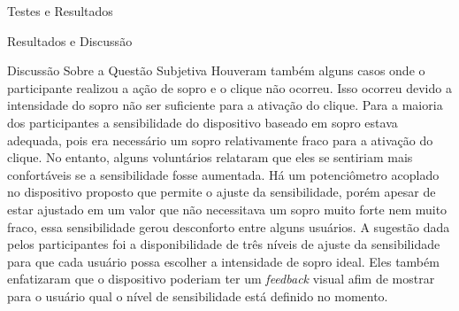 \begin{chapter}{Testes e Resultados}
\begin{section}{Resultados e Discussão}
\begin{subsection}{Discussão Sobre a Questão Subjetiva}
Houveram também alguns casos onde o participante realizou a ação de sopro e o
clique não ocorreu. Isso ocorreu devido a intensidade do sopro não ser
suficiente para a ativação do clique. Para a maioria dos participantes a
sensibilidade do dispositivo baseado em sopro estava adequada, pois era
necessário um sopro relativamente fraco para a ativação do clique. No entanto,
alguns voluntários relataram que eles se sentiriam mais confortáveis se a
sensibilidade fosse aumentada. Há um potenciômetro acoplado no dispositivo
proposto que permite o ajuste da sensibilidade, porém apesar de estar ajustado
em um valor que não necessitava um sopro muito forte nem muito fraco, essa
sensibilidade gerou desconforto entre alguns usuários. A sugestão dada pelos
participantes foi a disponibilidade de três níveis de ajuste da sensibilidade
para que cada usuário possa escolher a intensidade de sopro ideal. Eles também
enfatizaram que o  dispositivo poderiam ter um \textit{feedback} visual afim de
mostrar para o usuário qual o nível de sensibilidade está definido no momento.


\end{subsection}

\end{section}

\end{chapter}
